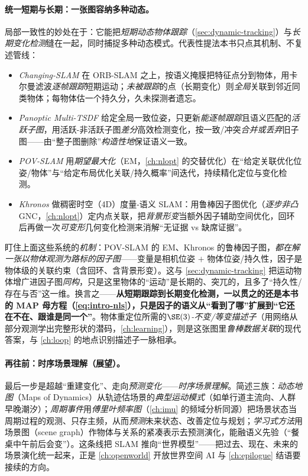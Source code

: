 \paragraph{统一短期与长期：一张图容纳多种动态。}
局部一致性的妙处在于：它能把\emph{短期动态物体跟踪}（\cref{sec:dynamic-tracking}）与\emph{长期变化检测}缝在一起，同时捕捉多种动态模式。代表性提法本书只点其机制、不复述管线\cite{schmid2026dynamic}：
\begin{itemize}
  \item \emph{Changing-SLAM} 在 ORB-SLAM 之上，按语义掩膜把特征点分到物体，用卡尔曼滤波\emph{逐帧跟踪}短期运动；\emph{未被跟踪}的点（长期变化）则\emph{全局}关联到邻近同类物体；每物体估一个持久分，久未探测者遗忘。
  \item \emph{Panoptic Multi-TSDF} 给定全局一致位姿，只更新\emph{能逐帧跟踪}且语义匹配的\emph{活跃子图}，用活跃-非活跃子图\emph{差分}高效检测变化，按一致/冲突\emph{合并或丢弃}旧子图——由“整子图删除”\emph{构造性地}保证语义一致。
  \item \emph{POV-SLAM} 用\emph{期望最大化}（EM，\cref{ch:nlopt} 的交替优化）在“给定关联优化位姿/物体”与“给定布局优化关联/持久概率”间迭代，持续精化定位与变化检测。
  \item \emph{Khronos} 做稠密时空（4D）度量-语义 SLAM：用鲁棒因子图优化（\emph{逐步非凸} GNC，\cref{ch:nlopt}）定内点关联，把\emph{背景形变}当额外因子辅助空间优化，回环后再做一次\emph{可变形}几何变化检测来消解“无证据 vs 缺席证据”。
\end{itemize}

\begin{insight}
盯住上面这些系统的\emph{机制}：POV-SLAM 的 EM、Khronos 的鲁棒因子图，\emph{都在解一张以物体观测为路标的因子图}——变量是相机位姿 $+$ 物体位姿/持久性，因子是物体级的关联约束（含回环、含背景形变）。这与 \cref{sec:dynamic-tracking} 把运动物体增广进因子图\emph{同构}，只是这里物体的“运动”是长期的、突兀的，且多了“持久性/存在与否”这一维。换言之——\textbf{从短期跟踪到长期变化检测，一以贯之的还是本书的 MAP 母方程（\cref{eq:intro-nls}），只是因子的语义从“看到了哪”扩展到“它还在不在、跟谁是同一个”}。物体重定位所需的\emph{$\SE(3)$-不变/等变描述子}（用网络从部分观测学出完整形状的潜码，\cref{ch:learning}），则是这张图里\emph{鲁棒数据关联}的现代答案，与 \cref{ch:loop} 的地点识别描述子一脉相承。
\end{insight}

\paragraph{再往前：时序场景理解（展望）。}
最后一步是超越“重建变化”、走向\emph{预测变化}——\emph{时序场景理解}。简述三族：\emph{动态地图}（Maps of Dynamics）从轨迹估场景的\emph{典型运动模式}（如单行道主流向、人群早晚潮汐）；\emph{周期事件}用\emph{傅里叶频率图}（\cref{ch:imu} 的频域分析同源）把场景状态当周期过程的观测、只存主频，从而\emph{预测}未来状态、改善定位与规划；\emph{学习式方法}用场景图（scene graph）作物体与关系的紧凑表示去预测演化，能融语义先验（“餐桌中午前后会变”）。这条线把 SLAM 推向“世界模型”——把过去、现在、未来的场景演化统一起来，正是 \cref{ch:openworld} 开放世界空间 AI 与 \cref{ch:epilogue} 结语要接续的方向。

